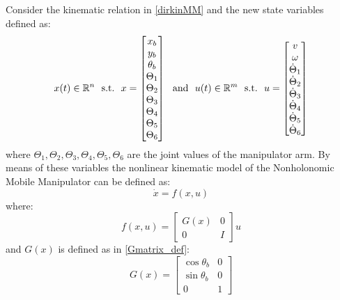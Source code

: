 Consider the kinematic relation in \ref{dirkinMM} and the new state variables defined as:
\begin{equation} \label{state_control_def}
{x}(t) \in \mathbb{R}^n\ \  \textnormal{s.t.}\ \  {x}  = \left[ \begin{matrix} x_b \\ y_b \\ \theta_b \\ \Theta_1 \\ \Theta_2 \\ \Theta_3 \\ \Theta_4 \\ \Theta_5 \\ \Theta_6 \end{matrix} \right]\ \   \textnormal{and}\ \  {u}(t) \in \mathbb{R}^m\ \ \textnormal{s.t.}\ \ {u}=\left[ \begin{matrix} v \\ \omega \\ \dot{\Theta}_1 \\ \dot{\Theta}_2 \\ \dot{\Theta}_3 \\ \dot{\Theta}_4 \\ \dot{\Theta}_5 \\ \dot{\Theta}_6 \end{matrix} \right]
\end{equation}
where $\Theta_1, \Theta_2, \Theta_3, \Theta_4, \Theta_5 ,\Theta_6$ are the joint values of the manipulator arm.
By means of these variables the nonlinear kinematic model of the Nonholonomic Mobile Manipulator can be defined as:
\begin{equation} \label{system_base}
	\dot{{x}}=f({x},{u})
\end{equation} 
where:
\begin{equation} \label{NLsystem}
	f({x},{u}) = \left[ \begin{matrix}
	G({x}) & 0 \\ 0 & I \end{matrix} \right]u
\end{equation}
and $G(x)$ is defined as in \ref{Gmatrix_def}:
\begin{equation*}
G({x}) =  \left[
\begin{matrix}
\cos\theta_b & 0 \\
\sin\theta_b & 0 \\
0 & 1 
\end{matrix}
\right] 
\end{equation*}

